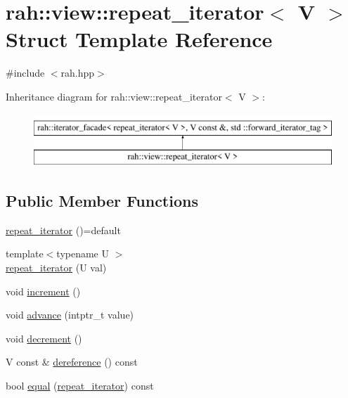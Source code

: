 \hypertarget{structrah_1_1view_1_1repeat__iterator}{}\section{rah\+::view\+::repeat\+\_\+iterator$<$ V $>$ Struct Template Reference}
\label{structrah_1_1view_1_1repeat__iterator}


{\ttfamily \#include $<$rah.\+hpp$>$}

Inheritance diagram for rah\+::view\+::repeat\+\_\+iterator$<$ V $>$\+:\begin{figure}[H]
\begin{center}
\leavevmode
\includegraphics[height=2.000000cm]{structrah_1_1view_1_1repeat__iterator}
\end{center}
\end{figure}
\subsection*{Public Member Functions}
\begin{DoxyCompactItemize}
\item 
\mbox{\hyperlink{structrah_1_1view_1_1repeat__iterator_a627f63a3a1ecf8a5dbcc88fb47d4a494}{repeat\+\_\+iterator}} ()=default
\item 
{\footnotesize template$<$typename U $>$ }\\\mbox{\hyperlink{structrah_1_1view_1_1repeat__iterator_af91bc578d1fe7d90373896abc8e56546}{repeat\+\_\+iterator}} (U val)
\item 
void \mbox{\hyperlink{structrah_1_1view_1_1repeat__iterator_a5556f69de4c759f4fec42c12d70ea869}{increment}} ()
\item 
void \mbox{\hyperlink{structrah_1_1view_1_1repeat__iterator_ae4376a0f9f5c50828941a7df853cc5cb}{advance}} (intptr\+\_\+t value)
\item 
void \mbox{\hyperlink{structrah_1_1view_1_1repeat__iterator_ae3ed58503233856a54f9dfcf662edaf6}{decrement}} ()
\item 
V const  \& \mbox{\hyperlink{structrah_1_1view_1_1repeat__iterator_a0b1fbfa1670a227d4d129dcdb9a549e8}{dereference}} () const
\item 
bool \mbox{\hyperlink{structrah_1_1view_1_1repeat__iterator_ab42103684163bf38275999ff908d3113}{equal}} (\mbox{\hyperlink{structrah_1_1view_1_1repeat__iterator}{repeat\+\_\+iterator}}) const
\end{DoxyCompactItemize}
